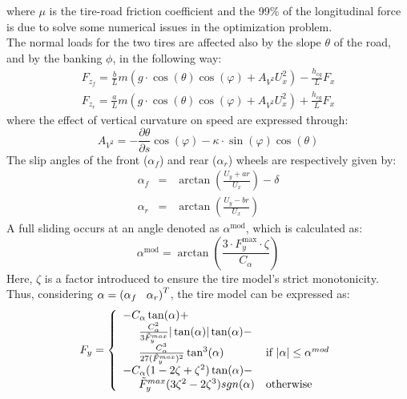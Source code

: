 \documentclass[a4paper, onecolumn, 11pt]{article}
\newcommand\tab[1][.3cm]{\hspace*{#1}}
\newcommand\tabeq[1][.5cm]{\hspace*{#1}}
\begin{document}
where $\mu$ is the tire-road friction coefficient and the 99\%  of the longitudinal force is due to solve 
some numerical issues in the optimization problem. \\
The normal loads for the two tires are affected also by the slope $\theta$ of the road, and by the banking $\phi$, in the following way:
\begin{subequations}
    \begin{eqnarray}
        \label{normal}
        F_{z_f} = \frac{b}{L}m(g\cdot \cos(\theta)\cos(\varphi)+A_{V^2}U_x^2)-\frac{h_{cg}}{L}F_x \\
        F_{z_r} = \frac{a}{L}m(g\cdot \cos(\theta)\cos(\varphi)+A_{V^2}U_x^2)+\frac{h_{cg}}{L}F_x
    \end{eqnarray}
\end{subequations}
where the effect of vertical curvature on speed are expressed through:
\begin{equation}
    A_{V^2} = -\frac{\partial \theta}{\partial s}\cos(\varphi)-\kappa\cdot \sin(\varphi)\cos(\theta) 
\end{equation}
The slip angles of the front ($\alpha_f$) and rear ($\alpha_r$) wheels are respectively given by:
\begin{subequations}
    \begin{eqnarray}
        \alpha_f &=& \arctan \left(\frac{U_y+ar}{U_x}\right)-\delta \\
        \alpha_r &=& \arctan \left(\frac{U_y-br}{U_x}\right)
    \end{eqnarray}
\end{subequations}
A full sliding occurs at an angle denoted as $\alpha^{\text{mod}}$, which is calculated as:
\begin{equation}
    \alpha^{\text{mod}} = \arctan\left(\frac{3\cdot F_y^{\text{max}}\cdot\zeta}{C_{\alpha}}\right)
\end{equation}
Here, $\zeta$ is a factor introduced to ensure the tire model's strict monotonicity.\\
Thus, considering $\alpha = \left(\alpha_f \tab \alpha_r\right)^T$, the tire model can
be expressed as:
\begin{equation}
    F_y = 
    \left\{
	\begin{array}{ll}
		-C_\alpha \tan(\alpha)+&\\
        \tabeq\frac{C_\alpha^2}{3\tilde{F}_y^{max}}|\tan(\alpha)|\tan(\alpha) - &\\
        \tabeq\frac{C_\alpha^3}{27(\tilde{F}_{y}^{max})^2}\tan^3(\alpha) 
        & \mbox{if } |\alpha| \leq \alpha^{mod} \\
		-C_{\alpha}(1-2\zeta+\zeta^2)\tan(\alpha)-&\\
        \tabeq \tilde{F}_y^{max}(3\zeta^2-2\zeta^3){sgn(\alpha)}
        & \mbox{otherwise }
	\end{array}
    \right.
\end{equation}
\end{document}
